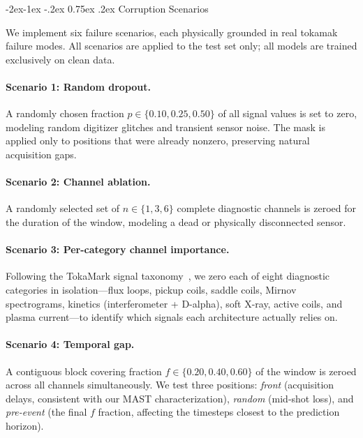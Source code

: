\documentclass[10pt,twocolumn]{article}
\makeatletter
\renewcommand\subsection{\@startsection{subsection}{2}{\z@}%
  {-2ex\@plus -1ex \@minus -.2ex}%
  {0.75ex \@plus .2ex}%
  {\normalfont\large\bfseries}}
\makeatother
\begin{document}
\subsection{Corruption Scenarios}
\label{sec:scenarios}

We implement six failure scenarios, each physically grounded in real
tokamak failure modes. All scenarios are applied to the test set only;
all models are trained exclusively on clean data.

\paragraph{Scenario 1: Random dropout.}
A randomly chosen fraction $p \in \{0.10, 0.25, 0.50\}$ of all signal
values is set to zero, modeling random digitizer glitches and transient
sensor noise. The mask is applied only to positions that were already
nonzero, preserving natural acquisition gaps.

\paragraph{Scenario 2: Channel ablation.}
A randomly selected set of $n \in \{1, 3, 6\}$ complete diagnostic
channels is zeroed for the duration of the window, modeling a dead or
physically disconnected sensor.

\paragraph{Scenario 3: Per-category channel importance.}
Following the TokaMark signal taxonomy~\cite{rousseau2026tokamark}, we
zero each of eight diagnostic categories in isolation—flux loops,
pickup coils, saddle coils, Mirnov spectrograms, kinetics (interferometer
+ D-alpha), soft X-ray, active coils, and plasma current—to identify
which signals each architecture actually relies on.

\paragraph{Scenario 4: Temporal gap.}
A contiguous block covering fraction $f \in \{0.20, 0.40, 0.60\}$ of
the window is zeroed across all channels simultaneously. We test three
positions: \textit{front} (acquisition delays, consistent with our MAST
characterization), \textit{random} (mid-shot loss), and \textit{pre-event}
(the final $f$ fraction, affecting the timesteps closest to the
prediction horizon).
\end{document}
